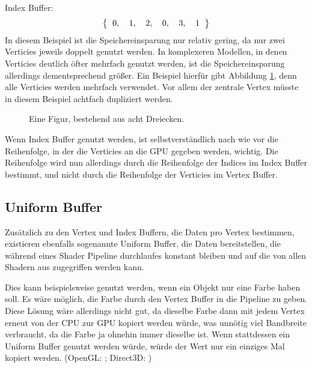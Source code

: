 Index Buffer:
$$
\left\{
\begin{tabular}{cccccc}
    0, & 1, & 2, & 0, & 3, & 1
\end{tabular}  
\right\}
$$
In diesem Beispiel ist die Speichereinsparung nur relativ gering, da nur zwei Verticies jeweils doppelt genutzt werden. In komplexeren Modellen, in denen Verticies deutlich öfter mehrfach genutzt werden, ist die Speichereinsparung allerdings dementsprechend größer. Ein Beispiel hierfür gibt Abbildung \ref{fig:vertexbufoct}, denn alle Verticies werden mehrfach verwendet. Vor allem der zentrale Vertex müsste in diesem Beispiel achtfach dupliziert werden.

\begin{figure}
    \caption{Eine Figur, bestehend aus acht Dreiecken.}
    \label{fig:vertexbufoct}
    \begin{center}
    \end{center}
\end{figure}

Wenn Index Buffer genutzt werden, ist selbstverständlich nach wie vor die Reihenfolge, in der die Verticies an die GPU gegeben werden, wichtig. Die Reihenfolge wird nun allerdings durch die Reihenfolge der Indices im Index Buffer bestimmt, und nicht durch die Reihenfolge der Verticies im Vertex Buffer.

\subsection{Uniform Buffer}
Zusätzlich zu den Vertex und Index Buffern, die Daten pro Vertex bestimmen, existieren ebenfalls sogenannte Uniform Buffer, die Daten bereitstellen, die während eines Shader Pipeline durchlaufes konstant bleiben und auf die von allen Shadern aus zugegriffen werden kann.

Dies kann beispielsweise genutzt werden, wenn ein Objekt nur eine Farbe haben soll. Es wäre möglich, die Farbe durch den Vertex Buffer in die Pipeline zu geben. Diese Lösung wäre allerdings nicht gut, da dieselbe Farbe dann mit jedem Vertex erneut von der CPU zur GPU kopiert werden würde, was unnötig viel Bandbreite verbraucht, da die Farbe ja ohnehin immer dieselbe ist. Wenn stattdessen ein Uniform Buffer genutzt werden würde, würde der Wert nur ein einziges Mal kopiert werden. (OpenGL: \cite{gl_uniforms}; Direct3D: \cite{d3d_buffers})

